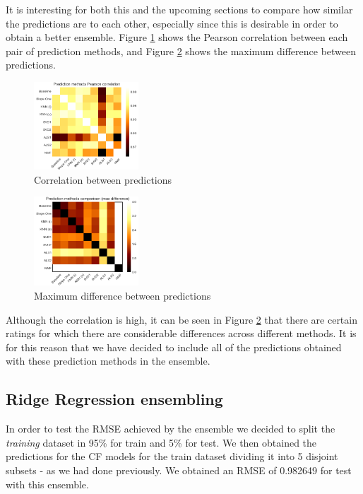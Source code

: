 \documentclass[10pt,conference,compsocconf]{IEEEtran}
\begin{document}
    It is interesting for both this and the upcoming sections to compare how similar the predictions are to each other, especially since this is desirable in order to obtain a better ensemble. Figure \ref{fig:CFcompcorr} shows the Pearson correlation between each pair of prediction methods, and Figure \ref{fig:CFcompmax} shows the maximum difference between predictions.

    \begin{figure}[htp]
      \centering
      \includegraphics[width=0.35\textwidth]{CFcompcorr}
      \caption{Correlation between predictions} %
      \label{fig:CFcompcorr}
    \end{figure}

    \begin{figure}[htp]
      \centering
      \includegraphics[width=0.35\textwidth]{CFcompmax}
      \caption{Maximum difference between predictions} %
      \label{fig:CFcompmax}
    \end{figure}

    Although the correlation is high, it can be seen in Figure \ref{fig:CFcompmax} that there are certain ratings for which there are considerable differences across different methods. It is for this reason that we have decided to include all of the predictions obtained with these prediction methods in the ensemble.
  \subsection{Ridge Regression ensembling} %
  \label{sub:ridge_regression_ensembling}
    In order to test the RMSE achieved by the ensemble we decided to split the \emph{training} dataset in 95\% for train and 5\% for test. We then obtained the predictions for the CF models for the train dataset dividing it into 5 disjoint subsets - as we had done previously. We obtained an RMSE of 0.982649 for test with this ensemble.
\end{document}

